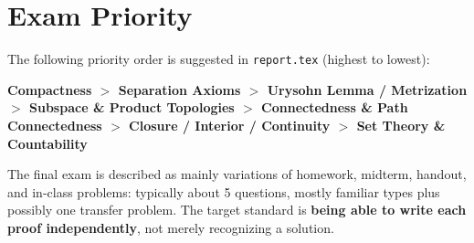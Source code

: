 \documentclass{article}
\begin{document}
\section{Exam Priority}

\noindent The following priority order is suggested in \texttt{report.tex} (highest to lowest):

\begin{center}
  \textbf{Compactness $>$ Separation Axioms $>$ Urysohn Lemma / Metrization $>$
  Subspace \& Product Topologies $>$ Connectedness \& Path Connectedness $>$
  Closure / Interior / Continuity $>$ Set Theory \& Countability}
\end{center}

The final exam is described as mainly variations of homework, midterm, handout,
and in-class problems: typically about 5 questions, mostly familiar types plus
possibly one transfer problem.
The target standard is \textbf{being able to write each proof independently},
not merely recognizing a solution.
\end{document}
